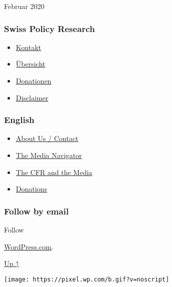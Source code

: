 Februar 2020

\hypertarget{swiss-policy-research}{%
\subsubsection{Swiss Policy Research}\label{swiss-policy-research}}

\begin{itemize}
\tightlist
\item
  \href{https://swprs.org/kontakt/}{Kontakt}
\item
  \href{https://swprs.org/uebersicht/}{Übersicht}
\item
  \href{https://swprs.org/donationen/}{Donationen}
\item
  \href{https://swprs.org/disclaimer/}{Disclaimer}
\end{itemize}

\hypertarget{english}{%
\subsubsection{English}\label{english}}

\begin{itemize}
\tightlist
\item
  \href{https://swprs.org/contact/}{About Us / Contact}
\item
  \href{https://swprs.org/media-navigator/}{The Media Navigator}
\item
  \href{https://swprs.org/the-american-empire-and-its-media/}{The CFR
  and the Media}
\item
  \href{https://swprs.org/donations/}{Donations}
\end{itemize}

\hypertarget{follow-by-email}{%
\subsubsection{Follow by email}\label{follow-by-email}}

Follow

\href{https://wordpress.com/?ref=footer_custom_com}{WordPress.com}.

\protect\hyperlink{}{Up ↑}

\texttt{[image: https://pixel.wp.com/b.gif?v=noscript]}
